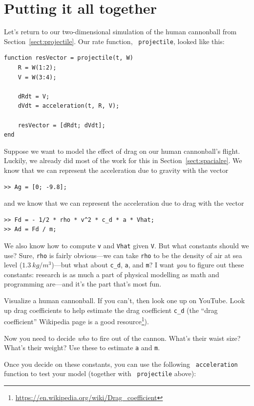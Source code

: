 \documentclass[
]{book}
\begin{document}
\section{Putting it all together}

Let's return to our two-dimensional simulation of the human cannonball
from Section~\ref{sect:projectile}. Our rate function, {\tt
projectile}, looked like this:

\begin{verbatim}
function resVector = projectile(t, W)
    R = W(1:2);
    V = W(3:4);

    dRdt = V;
    dVdt = acceleration(t, R, V);

    resVector = [dRdt; dVdt];
end
\end{verbatim}

Suppose we want to model the effect of drag on our human cannonball's
flight. Luckily, we already did most of the work for this in
Section~\ref{sect:spacialre}. We know that we can represent the acceleration
due to gravity with the vector

\begin{verbatim}
>> Ag = [0; -9.8];
\end{verbatim}

and we know that we can represent the acceleration due to drag with the
vector

\begin{verbatim}
>> Fd = - 1/2 * rho * v^2 * c_d * a * Vhat;
>> Ad = Fd / m;
\end{verbatim}

We also know how to compute {\tt v} and {\tt Vhat} given {\tt V}. But
what constants should we use? Sure, {\tt rho} is fairly obvious---we can
take {\tt rho} to be the density of air at sea level ($1.3 ~
kg/m^3$)---but what about {\tt c\_d}, {\tt a}, and {\tt m}? I want
\textit{you} to figure out these constants: research is as much a part
of physical modelling as math and programming are---and it's the part
that's most fun.

Visualize a human cannonball. If you can't, then look one up on
YouTube. Look up drag coefficients to help estimate the drag
coefficient {\tt c\_d} (the ``drag coefficient'' Wikipedia page is a good
resource\footnote{\url{https://en.wikipedia.org/wiki/Drag_coefficient}}).

Now you need to decide \textit{who} to fire out of the cannon. What's
their waist size? What's their weight? Use these to estimate {\tt a} and
{\tt m}.

Once you decide on these constants, you can use the following {\tt
acceleration} function to test your model (together with {\tt
projectile} above):
\end{document}
